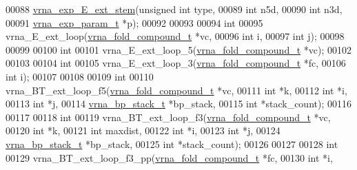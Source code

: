 \begin{DoxyCode}
00088 \hyperlink{group__loops_ga357484958d3cd677f88f16c75c8a5730}{vrna\_exp\_E\_ext\_stem}(\textcolor{keywordtype}{unsigned} \textcolor{keywordtype}{int}      type,
00089                     \textcolor{keywordtype}{int}               n5d,
00090                     \textcolor{keywordtype}{int}               n3d,
00091                     \hyperlink{group__energy__parameters_structvrna__exp__param__s}{vrna\_exp\_param\_t}  *p);
00092 
00093 
00094 \textcolor{keywordtype}{int}
00095 vrna\_E\_ext\_loop(\hyperlink{group__fold__compound_structvrna__fc__s}{vrna\_fold\_compound\_t}  *vc,
00096                 \textcolor{keywordtype}{int}                   i,
00097                 \textcolor{keywordtype}{int}                   j);
00098 
00099 
00100 \textcolor{keywordtype}{int}
00101 vrna\_E\_ext\_loop\_5(\hyperlink{group__fold__compound_structvrna__fc__s}{vrna\_fold\_compound\_t} *vc);
00102 
00103 
00104 \textcolor{keywordtype}{int}
00105 vrna\_E\_ext\_loop\_3(\hyperlink{group__fold__compound_structvrna__fc__s}{vrna\_fold\_compound\_t}  *fc,
00106                   \textcolor{keywordtype}{int}                   i);
00107 
00108 
00109 \textcolor{keywordtype}{int}
00110 vrna\_BT\_ext\_loop\_f5(\hyperlink{group__fold__compound_structvrna__fc__s}{vrna\_fold\_compound\_t}  *vc,
00111                     \textcolor{keywordtype}{int}                   *k,
00112                     \textcolor{keywordtype}{int}                   *i,
00113                     \textcolor{keywordtype}{int}                   *j,
00114                     \hyperlink{group__data__structures_structvrna__bp__stack__s}{vrna\_bp\_stack\_t}       *bp\_stack,
00115                     \textcolor{keywordtype}{int}                   *stack\_count);
00116 
00117 
00118 \textcolor{keywordtype}{int}
00119 vrna\_BT\_ext\_loop\_f3(\hyperlink{group__fold__compound_structvrna__fc__s}{vrna\_fold\_compound\_t}  *vc,
00120                     \textcolor{keywordtype}{int}                   *k,
00121                     \textcolor{keywordtype}{int}                   maxdist,
00122                     \textcolor{keywordtype}{int}                   *i,
00123                     \textcolor{keywordtype}{int}                   *j,
00124                     \hyperlink{group__data__structures_structvrna__bp__stack__s}{vrna\_bp\_stack\_t}       *bp\_stack,
00125                     \textcolor{keywordtype}{int}                   *stack\_count);
00126 
00127 
00128 \textcolor{keywordtype}{int}
00129 vrna\_BT\_ext\_loop\_f3\_pp(\hyperlink{group__fold__compound_structvrna__fc__s}{vrna\_fold\_compound\_t} *fc,
00130                        \textcolor{keywordtype}{int}                  *i,

\end{DoxyCode}
